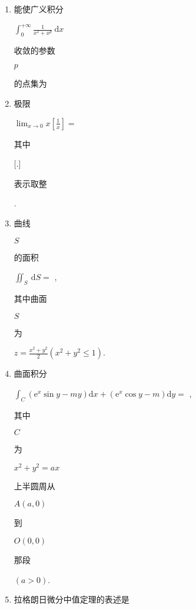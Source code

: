 \documentclass[10pt]{article}
\begin{document}
\begin{enumerate}
  \item \begin{CJK}{UTF8}{mj}能使广义积分\end{CJK} $\int_{0}^{+\infty} \frac{1}{x^{2}+x^{p}} \mathrm{~d} x$ \begin{CJK}{UTF8}{mj}收敛的参数\end{CJK} $p$ \begin{CJK}{UTF8}{mj}的点集为\end{CJK}

  \item \begin{CJK}{UTF8}{mj}极限\end{CJK} $\lim _{x \rightarrow 0} x\left[\frac{1}{x}\right]=$ \begin{CJK}{UTF8}{mj}其中\end{CJK} [.] \begin{CJK}{UTF8}{mj}表示取整\end{CJK}.

  \item \begin{CJK}{UTF8}{mj}曲线\end{CJK} $S$ \begin{CJK}{UTF8}{mj}的面积\end{CJK} $\iint_{S} \mathrm{~d} S=$ , \begin{CJK}{UTF8}{mj}其中曲面\end{CJK} $S$ \begin{CJK}{UTF8}{mj}为\end{CJK} $z=\frac{x^{2}+y^{2}}{2}\left(x^{2}+y^{2} \leqslant 1\right)$.

  \item \begin{CJK}{UTF8}{mj}曲面积分\end{CJK} $\int_{C}\left(\mathrm{e}^{x} \sin y-m y\right) \mathrm{d} x+\left(\mathrm{e}^{x} \cos y-m\right) \mathrm{d} y=$ , \begin{CJK}{UTF8}{mj}其中\end{CJK} $C$ \begin{CJK}{UTF8}{mj}为\end{CJK} $x^{2}+y^{2}=a x$ \begin{CJK}{UTF8}{mj}上半圆周从\end{CJK} $A(a, 0)$ \begin{CJK}{UTF8}{mj}到\end{CJK} $O(0,0)$ \begin{CJK}{UTF8}{mj}那段\end{CJK} $(a>0)$.

  \item \begin{CJK}{UTF8}{mj}拉格朗日微分中值定理的表述是\end{CJK}

\end{enumerate}
\end{document}
